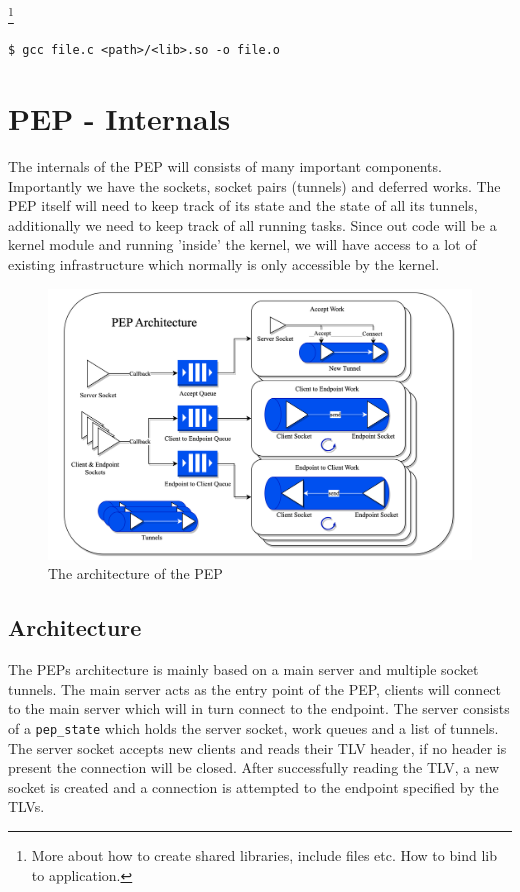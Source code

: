 \documentclass[a4paper,english, 11pt]{report}
\begin{document}
\footnote{More about how to create shared libraries, include files etc. How to bind lib to application.}

\begin{verbatim}
$ gcc file.c <path>/<lib>.so -o file.o
\end{verbatim}

\section{PEP - Internals}
The internals of the PEP will consists of many important components. Importantly we have the sockets, socket pairs (tunnels) and deferred works. The PEP itself will need to keep track of its state and the state of all its tunnels, additionally we need to keep track of all running tasks. Since out code will be a kernel module and running 'inside' the kernel, we will have access to a lot of existing infrastructure which normally is only accessible by the kernel. 

\begin{figure} %
	\centering
	\includegraphics[scale=0.35]{../diagrams/drawio/pep_architecture.png}
  	\caption{The architecture of the PEP}
  	\label{fig:pep_architecture}
\end{figure}

\subsection{Architecture}
The PEPs architecture is mainly based on a main server and multiple socket tunnels. The main server acts as the entry point of the PEP, clients will connect to the main server which will in turn connect to the endpoint. The server consists of a \verb|pep_state| which holds the server socket, work queues and a list of tunnels. The server socket accepts new clients and reads their TLV header, if no header is present the connection will be closed. After successfully reading the TLV, a new socket is created and a connection is attempted to the endpoint specified by the TLVs.\\
\end{document}
